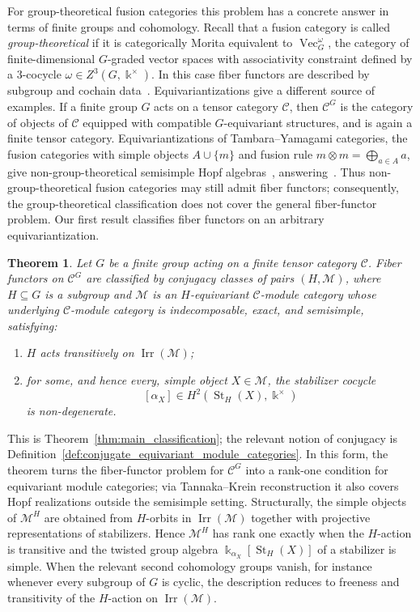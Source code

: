 \documentclass[12pt]{amsart}
\theoremstyle{plain}
\newtheorem{theorem}{Theorem}[section]
\theoremstyle{definition} %
\theoremstyle{remark} %
\newcommand{\ku}{{\Bbbk}} %
\DeclareMathOperator{\VecCat}{Vec}
\newcommand{\cC}{\mathcal{C}}
\newcommand{\cM}{\mathcal{M}}
\newcommand{\Irr}{\operatorname{Irr}}
\newcommand{\St}{\operatorname{St}}
\begin{document}
For group-theoretical fusion categories this problem has a concrete answer in terms of finite groups and cohomology. Recall that a fusion category is called \emph{group-theoretical} if it is categorically Morita equivalent to $\VecCat_G^\omega$, the category of finite-dimensional $G$-graded vector spaces with associativity constraint defined by a $3$-cocycle $\omega\in Z^3(G,\ku^\times)$. In this case fiber functors are described by subgroup and cochain data~\cite{Os03, Nik08}. Equivariantizations give a different source of examples. If a finite group $G$ acts on a tensor category $\cC$, then $\cC^G$ is the category of objects of $\cC$ equipped with compatible $G$-equivariant structures, and is again a finite tensor category. Equivariantizations of Tambara--Yamagami categories, the fusion categories with simple objects $A\cup\{m\}$ and fusion rule $m\otimes m=\bigoplus_{a\in A}a$, give non-group-theoretical semisimple Hopf algebras~\cite{Nik08, TY98}, answering~\cite[Question~8.45]{ENO05}. Thus non-group-theoretical fusion categories may still admit fiber functors; consequently, the group-theoretical classification does not cover the general fiber-functor problem. Our first result classifies fiber functors on an arbitrary equivariantization.

\begin{theorem}\label{thm:intro_main_classification}
Let $G$ be a finite group acting on a finite tensor category $\cC$. Fiber functors on $\cC^G$ are classified by conjugacy classes of pairs $(H,\cM)$, where $H\subseteq G$ is a subgroup and $\cM$ is an $H$-equivariant $\cC$-module category whose underlying $\cC$-module category is indecomposable, exact, and semisimple, satisfying:
\begin{enumerate}
\item $H$ acts transitively on $\Irr(\cM)$;
\item for some, and hence every, simple object $X\in\cM$, the stabilizer cocycle
\[
[\alpha_X]\in H^2(\St_H(X),\ku^\times)
\]
is non-degenerate.
\end{enumerate}
\end{theorem}

This is Theorem~\ref{thm:main_classification}; the relevant notion of conjugacy is Definition~\ref{def:conjugate_equivariant_module_categories}. In this form, the theorem turns the fiber-functor problem for $\cC^G$ into a rank-one condition for equivariant module categories; via Tannaka--Krein reconstruction it also covers Hopf realizations outside the semisimple setting. Structurally, the simple objects of $\cM^H$ are obtained from $H$-orbits in $\Irr(\cM)$ together with projective representations of stabilizers. Hence $\cM^H$ has rank one exactly when the $H$-action is transitive and the twisted group algebra $\ku_{\alpha_X}[\St_H(X)]$ of a stabilizer is simple. When the relevant second cohomology groups vanish, for instance whenever every subgroup of $G$ is cyclic, the description reduces to freeness and transitivity of the $H$-action on $\Irr(\cM)$.
\end{document}
